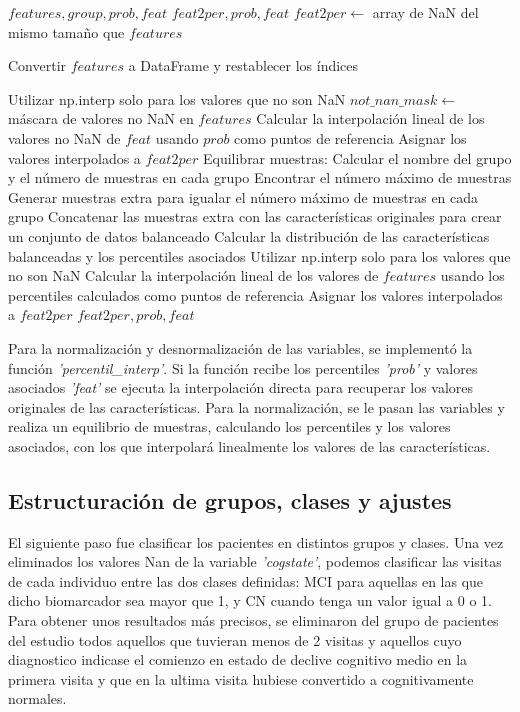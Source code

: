 \begin{algorithm}
	\caption{percentil\_interp}
	\begin{algorithmic}
		\REQUIRE $features, group, prob, feat$
		\ENSURE $feat2per, prob, feat$
		\STATE $feat2per \leftarrow$ array de NaN del mismo tamaño que $features$
		
		\STATE Convertir $features$ a DataFrame y restablecer los índices
		\ENDIF
		
		\STATE Utilizar np.interp solo para los valores que no son NaN
		\STATE $not\_nan\_mask \leftarrow$ máscara de valores no NaN en $features$
		\STATE Calcular la interpolación lineal de los valores no NaN de $feat$ usando $prob$ como puntos de referencia
		\STATE Asignar los valores interpolados a $feat2per$
		\ELSE
		\STATE Equilibrar muestras:
		\STATE Calcular el nombre del grupo y el número de muestras en cada grupo
		\STATE Encontrar el número máximo de muestras
		\STATE Generar muestras extra para igualar el número máximo de muestras en cada grupo
		\STATE Concatenar las muestras extra con las características originales para crear un conjunto de datos balanceado
		\STATE Calcular la distribución de las características balanceadas y los percentiles asociados
		\STATE Utilizar np.interp solo para los valores que no son NaN
		\STATE Calcular la interpolación lineal de los valores de $features$ usando los percentiles calculados como puntos de referencia
		\STATE Asignar los valores interpolados a $feat2per$
		\ENDIF
		\RETURN $feat2per, prob, feat$
	\end{algorithmic}
\end{algorithm}

Para la normalización y desnormalización de las variables, se implementó la función \textit{'percentil\_interp'}. Si la función recibe los percentiles \textit{'prob'} y valores asociados \textit{'feat'} se ejecuta la interpolación directa para recuperar los valores originales de las características. Para la normalización, se le pasan las variables y  realiza un equilibrio de muestras, calculando los percentiles y los valores asociados, con los que interpolará linealmente los valores de las características.\\

\subsection{Estructuración de grupos, clases y ajustes}
El siguiente paso fue clasificar los pacientes en distintos grupos y clases. Una vez eliminados los valores Nan de la variable \textit{'cogstate'}, podemos clasificar las visitas de cada individuo entre las dos clases definidas: MCI para aquellas en las que dicho biomarcador sea mayor que 1, y CN cuando tenga un valor igual a 0 o 1. Para obtener unos resultados más precisos, se eliminaron del grupo de pacientes del estudio todos aquellos que tuvieran menos de 2 visitas y aquellos cuyo diagnostico indicase el comienzo en estado de declive cognitivo medio en la primera visita y que en la ultima visita hubiese convertido a cognitivamente normales.\\

